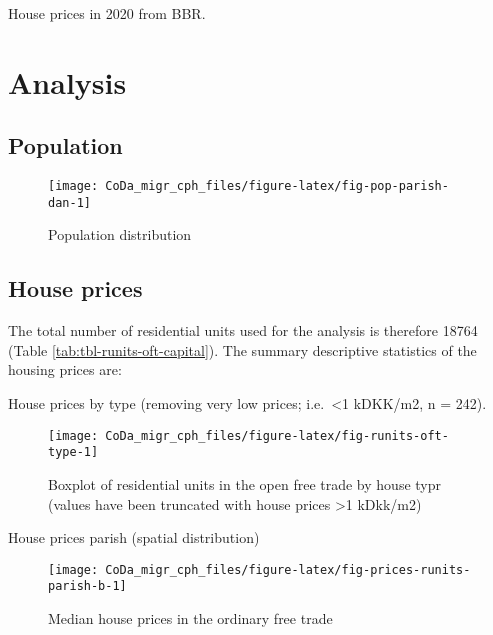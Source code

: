 \documentclass[
  12pt,
]{article}
\begin{document}
House prices in 2020 from BBR.

\hypertarget{analysis}{%
\section{Analysis}\label{analysis}}

\hypertarget{population-1}{%
\subsection{Population}\label{population-1}}

\begin{figure}[H]

{\centering \texttt{[image: CoDa\_migr\_cph\_files/figure-latex/fig-pop-parish-dan-1]} 

}

\caption{Population distribution}\label{fig:fig-pop-parish-dan}
\end{figure}

\hypertarget{house-prices-1}{%
\subsection{House prices}\label{house-prices-1}}

The total number of residential units used for the analysis is therefore 18764 (Table \ref{tab:tbl-runits-oft-capital}). The summary descriptive statistics of the housing prices are:

House prices by type (removing very low prices; i.e.~\textless1 kDKK/m2, n = 242).

\begin{figure}[H]

{\centering \texttt{[image: CoDa\_migr\_cph\_files/figure-latex/fig-runits-oft-type-1]} 

}

\caption{Boxplot of residential units in the open free trade by house typr (values have been truncated with house prices >1 kDkk/m2)}\label{fig:fig-runits-oft-type}
\end{figure}

House prices parish (spatial distribution)

\begin{figure}[H]

{\centering \texttt{[image: CoDa\_migr\_cph\_files/figure-latex/fig-prices-runits-parish-b-1]} 

}

\caption{Median house prices in the ordinary free trade}\label{fig:fig-prices-runits-parish-b}
\end{figure}
\end{document}
